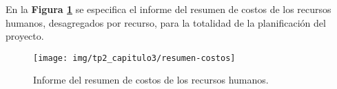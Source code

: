 En la \textbf{Figura \ref{resumen-costos}} se especifica el informe del resumen de costos de los recursos humanos, desagregados por recurso, para la totalidad de la planificación del proyecto.

\begin{figure}[h]
    \centering
    \texttt{[image: img/tp2\_capitulo3/resumen-costos]}
    \caption{Informe del resumen de costos de los recursos humanos.}
    \label{resumen-costos}
\end{figure}

\begin{comment}


PRECIOS BUSCADOS POR MI (IVÁN):
====================================
Oficina:
 $ 1.500 - 5 SECCION. SIN EXPENSAS.

Alquilo privado en lugar con 2 privados mas. Sin expensas. Excelente ubicación, servicio de wi-fi, calefacción, sala de reuniones, sala de espera/recepción, cocina, baño completo. Lugar en via publica para estacionar comodamente. Sistema de vigilancia monitoreada con alarma. Preferentemente para Arquitecto, Ingeniero, Agrimensor, Contador, Ingeniero

http://napsix.mdzol.com/mendoza/viewPost.jsp?id=c1650036-25ab-45c5-8d13-4f9510b3d6e0
====================================
Computadoras Notebooks:
Notebook DELL I3442/3_I541TBW8S_5 Intel Core i5

$13.399
Código: 211.147 

Generales

    Marca CPU Intel
    Versión CPU Core i5
    Modelo CPU 4210U
    Velocidad CPU 2.7 GHz
    Memoria Ram 4 GB
    Pad Numérico No
    Unidad Óptica DVD+/-RW
    Procesador Gráfico Intel® HD Graphics 4400
    Sistema Operativo Windows 8
    Versión OS 8.1
    WebCam Incorporada
    Capacidad Disco Rígido 1TB
    Color Negro
    Origen China

Pantalla

    Tamaño de Pantalla 14"
    Tipo de Pantalla LED
    Resolución 1366 x 768

Conectividad

    Wi-Fi Sí
    Bluetooth Sí
    Versión Bluetooth 4.0
    USB 2.0 2
    Puerto Ethernet No
    Salida HDMI No 
https://www.garbarino.com/producto/notebook-dell-i34423_i541tbw8s_5-intel-core-i5/a170746c2a
====================================
Sillas:
Silla Executive
Código 	A-1202
Alto 	116 cm
Ancho 	60 cm
Profundidad 	69 cm
Apilables 	NO
Colores Disponibles 	
$3100
http://desillas.com/producto-28-silla-de-oficina-y-computadora-con-ruedas-ergonomica-y-regulable.html
====================================
Sillon
Sillon Barcelona
Código 	F-1382
Alto 	75 cm
Ancho 	75 cm
Profundidad 	80 cm
Apilables 	NO
Colores Disponibles 	
$3900
http://desillas.com/producto-115-sillon-barcelona-cromado.html
====================================
Escritorio Para Oficina / Mesas Para Computacion
Para 1 persona - 120cm x 75 cm x 60 cm
Precio
$ 949.00	
http://articulo.mercadolibre.com.ar/MLA-562294620-escritorio-muebles-para-oficina-mesas-para-computacion-_JM


\end{comment}
